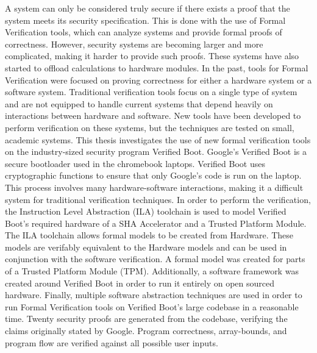 A system can only be considered truly secure if there exists a proof that the system meets its security specification. 
This is done with the use of Formal Verification tools, which can analyze systems and provide formal proofs of correctness.
However, security systems are becoming larger and more complicated, making it harder to provide such proofs. 
These systems have also started to offload calculations to hardware modules.
In the past, tools for Formal Verification were focused on proving correctness for either a hardware system or a software system.
Traditional verification tools focus on a single type of system and are not equipped to handle current systems that depend heavily on interactions between hardware and software.
New tools have been developed to perform verification on these systems, but the techniques are tested on small, academic systems.
This thesis investigates the use of new formal verification tools on the industry-sized security program Verified Boot.
Google's Verified Boot is a secure bootloader used in the chromebook laptops.
Verified Boot uses cryptographic functions to ensure that only Google's code is run on the laptop.
This process involves many hardware-software interactions, making it a difficult system for traditional verification techniques.
In order to perform the verification, the Instruction Level Abstraction (ILA) toolchain is used to model Verified Boot's required hardware of a SHA Accelerator and a Trusted Platform Module.
The ILA toolchain allows formal models to be created from Hardware.
These models are verifably equivalent to the Hardware models and can be used in conjunction with the software verification. 
A formal model was created for parts of a Trusted Platform Module (TPM). 
Additionally, a software framework was created around Verified Boot in order to run it entirely on open sourced hardware.
Finally, multiple software abstraction techniques are used in order to run Formal Verification tools on Verified Boot's large codebase in a reasonable time.
Twenty security proofs are generated from the codebase, verifying the claims originally stated by Google.
Program correctness, array-bounds, and program flow are verified against all possible user inputs.
